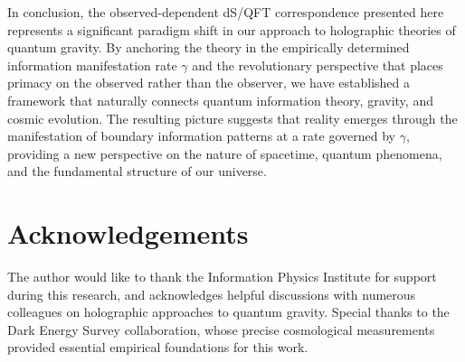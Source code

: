 \documentclass[11pt,english,twoside]{article}
\theoremstyle{plain}
\theoremstyle{definition}
\theoremstyle{remark}
\newcommand{\gammaR}{\gamma}
\begin{document}
In conclusion, the observed-dependent dS/QFT correspondence presented here represents a significant paradigm shift in our approach to holographic theories of quantum gravity. By anchoring the theory in the empirically determined information manifestation rate $\gammaR$ and the revolutionary perspective that places primacy on the observed rather than the observer, we have established a framework that naturally connects quantum information theory, gravity, and cosmic evolution. The resulting picture suggests that reality emerges through the manifestation of boundary information patterns at a rate governed by $\gammaR$, providing a new perspective on the nature of spacetime, quantum phenomena, and the fundamental structure of our universe.

\section*{Acknowledgements}
The author would like to thank the Information Physics Institute for support during this research, and acknowledges helpful discussions with numerous colleagues on holographic approaches to quantum gravity. Special thanks to the Dark Energy Survey collaboration, whose precise cosmological measurements provided essential empirical foundations for this work.
\end{document}
